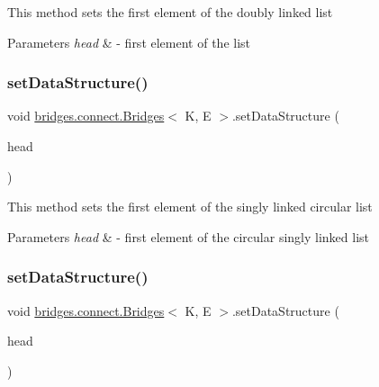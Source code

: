 This method sets the first element of the doubly linked list


\begin{DoxyParams}{Parameters}
{\em head} & -\/ first element of the list \\
\hline
\end{DoxyParams}
\hypertarget{classbridges_1_1connect_1_1_bridges_a285a7af5ad0594d4eeca51277e627c89}{}\label{classbridges_1_1connect_1_1_bridges_a285a7af5ad0594d4eeca51277e627c89} 
\subsubsection{\texorpdfstring{set\+Data\+Structure()}{setDataStructure()}\hspace{0.1cm}{\footnotesize\ttfamily [5/12]}}
{\footnotesize\ttfamily void \hyperlink{classbridges_1_1connect_1_1_bridges}{bridges.\+connect.\+Bridges}$<$ K, E $>$.set\+Data\+Structure (\begin{DoxyParamCaption}\item[{\hyperlink{classbridges_1_1base_1_1_circ_s_lelement}{Circ\+S\+Lelement}$<$ E $>$}]{head }\end{DoxyParamCaption})}

This method sets the first element of the singly linked circular list


\begin{DoxyParams}{Parameters}
{\em head} & -\/ first element of the circular singly linked list \\
\hline
\end{DoxyParams}
\hypertarget{classbridges_1_1connect_1_1_bridges_a4e5809b18d15854b54509f9d434a4fd7}{}\label{classbridges_1_1connect_1_1_bridges_a4e5809b18d15854b54509f9d434a4fd7} 
\subsubsection{\texorpdfstring{set\+Data\+Structure()}{setDataStructure()}\hspace{0.1cm}{\footnotesize\ttfamily [6/12]}}
{\footnotesize\ttfamily void \hyperlink{classbridges_1_1connect_1_1_bridges}{bridges.\+connect.\+Bridges}$<$ K, E $>$.set\+Data\+Structure (\begin{DoxyParamCaption}\item[{\hyperlink{classbridges_1_1base_1_1_circ_d_lelement}{Circ\+D\+Lelement}$<$ E $>$}]{head }\end{DoxyParamCaption})}

